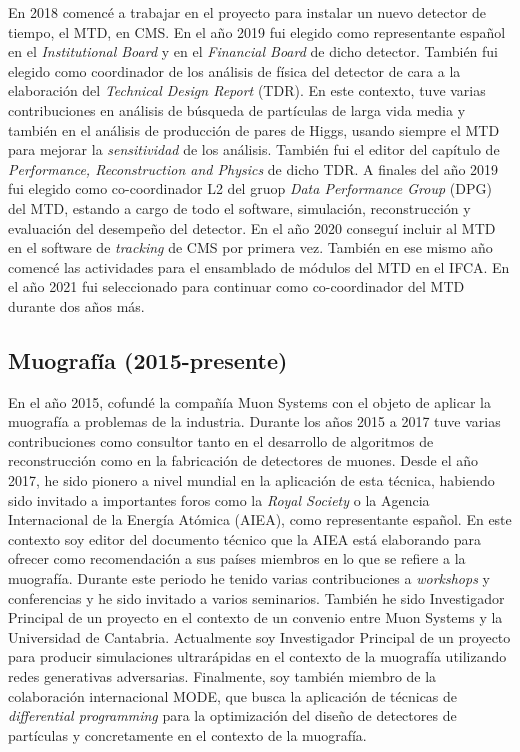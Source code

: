 En 2018 comencé a trabajar en el proyecto para instalar un nuevo detector de tiempo, el MTD, en CMS. En el año 2019 fui elegido como representante español en el \emph{Institutional Board} y en el \emph{Financial Board} de dicho detector. También fui elegido como coordinador de los análisis de física del detector de cara a la elaboración del \emph{Technical Design Report} (TDR). En este contexto, tuve varias contribuciones en análisis de búsqueda de partículas de larga vida media y también en el análisis de producción de pares de Higgs, usando siempre el MTD para mejorar la \emph{sensitividad} de los análisis. También fui el editor del capítulo de \emph{Performance, Reconstruction and Physics} de dicho TDR. A finales del año 2019 fui elegido como co-coordinador L2 del gruop \emph{Data Performance Group} (DPG) del MTD, estando a cargo de todo el software, simulación, reconstrucción y evaluación del desempeño del detector. En el año 2020 conseguí incluir al MTD en el software de \emph{tracking} de CMS por primera vez. También en ese mismo año comencé las actividades para el ensamblado de módulos del MTD en el IFCA. En el año 2021 fui seleccionado para continuar como co-coordinador del MTD durante dos años más.  

\subsection{Muografía (2015-presente)}

En el año 2015, cofundé la compañía Muon Systems con el objeto de aplicar la muografía a problemas de la industria. Durante los años 2015 a 2017 tuve varias contribuciones como consultor tanto en el desarrollo de algoritmos de reconstrucción como en la fabricación de detectores de muones. Desde el año 2017, he sido pionero a nivel mundial en la aplicación de esta técnica, habiendo sido invitado a importantes foros como la \emph{Royal Society} o la Agencia Internacional de la Energía Atómica (AIEA), como representante español. En este contexto soy editor del documento técnico que la AIEA está elaborando para ofrecer como recomendación a sus países miembros en lo que se refiere a la muografía. Durante este periodo he tenido varias contribuciones a \emph{workshops} y conferencias y he sido invitado a varios seminarios. También he sido Investigador Principal de un proyecto en el contexto de un convenio entre Muon Systems y la Universidad de Cantabria. Actualmente soy Investigador Principal de un proyecto para producir simulaciones ultrarápidas en el contexto de la muografía utilizando redes generativas adversarias. Finalmente, soy también miembro de la colaboración internacional MODE, que busca la aplicación de técnicas de \emph{differential programming} para la optimización del diseño de detectores de partículas y concretamente en el contexto de la muografía. 
